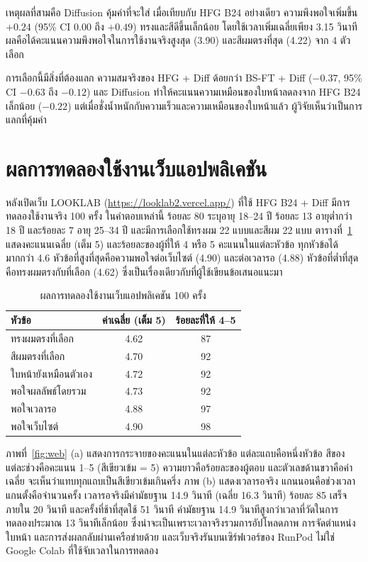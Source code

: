 เหตุผลที่สามคือ Diffusion คุ้มค่าที่จะใส่ เมื่อเทียบกับ HFG B24 อย่างเดียว
ความพึงพอใจเพิ่มขึ้น $+0.24$ (95\% CI 0.00 ถึง $+0.49$) ทรงและสีดีขึ้นเล็กน้อย โดยใช้เวลาเพิ่มเฉลี่ยเพียง 3.15 วินาที
ผลคือได้คะแนนความพึงพอใจในการใช้งานจริงสูงสุด (3.90) และสีผมตรงที่สุด (4.22) จาก 4 ตัวเลือก

การเลือกนี้มีสิ่งที่ต้องแลก ความสมจริงของ HFG + Diff ด้อยกว่า BS-FT + Diff
($-0.37$, 95\% CI $-0.63$ ถึง $-0.12$) และ Diffusion ทำให้คะแนนความเหมือนของใบหน้าลดลงจาก HFG B24 เล็กน้อย ($-0.22$)
แต่เมื่อชั่งน้ำหนักกับความเร็วและความเหมือนของใบหน้าแล้ว ผู้วิจัยเห็นว่าเป็นการแลกที่คุ้มค่า

\section{ผลการทดลองใช้งานเว็บแอปพลิเคชัน}

หลังเปิดเว็บ LOOKLAB (\url{https://looklab2.vercel.app/}) ที่ใช้ HFG B24 + Diff มีการทดลองใช้งานจริง 100 ครั้ง
ในคำตอบเหล่านี้ ร้อยละ 80 ระบุอายุ 18--24 ปี ร้อยละ 13 อายุต่ำกว่า 18 ปี และร้อยละ 7 อายุ 25--34 ปี
และมีการเลือกใช้ทรงผม 22 แบบและสีผม 22 แบบ
ตารางที่~\ref{tab:web} แสดงคะแนนเฉลี่ย (เต็ม 5) และร้อยละของผู้ที่ให้ 4 หรือ 5 คะแนนในแต่ละหัวข้อ
ทุกหัวข้อได้มากกว่า 4.6 หัวข้อที่สูงที่สุดคือความพอใจต่อเว็บไซต์ (4.90) และต่อเวลารอ (4.88)
หัวข้อที่ต่ำที่สุดคือทรงผมตรงกับที่เลือก (4.62) ซึ่งเป็นเรื่องเดียวกับที่ผู้ใช้เขียนข้อเสนอแนะมา

\begin{table}[!htbp]
\centering
\caption{ผลการทดลองใช้งานเว็บแอปพลิเคชัน 100 ครั้ง}
\label{tab:web}
\begin{tabular}{|l|c|c|}
\hline
\textbf{หัวข้อ} & \textbf{ค่าเฉลี่ย (เต็ม 5)} & \textbf{ร้อยละที่ให้ 4--5} \\ \hline
ทรงผมตรงที่เลือก & 4.62 & 87 \\ \hline
สีผมตรงที่เลือก & 4.70 & 92 \\ \hline
ใบหน้ายังเหมือนตัวเอง & 4.72 & 92 \\ \hline
พอใจผลลัพธ์โดยรวม & 4.73 & 92 \\ \hline
พอใจเวลารอ & 4.88 & 97 \\ \hline
พอใจเว็บไซต์ & 4.90 & 98 \\ \hline
\end{tabular}
\end{table}

ภาพที่~\ref{fig:web} (a) แสดงการกระจายของคะแนนในแต่ละหัวข้อ
แต่ละแถบคือหนึ่งหัวข้อ สีของแต่ละช่วงคือคะแนน 1--5 (สีเขียวเข้ม = 5) ความยาวคือร้อยละของผู้ตอบ
และตัวเลขด้านขวาคือค่าเฉลี่ย จะเห็นว่าแทบทุกแถบเป็นสีเขียวเข้มเกินครึ่ง
ภาพ (b) แสดงเวลารอจริง แกนนอนคือช่วงเวลา แกนตั้งคือจำนวนครั้ง
เวลารอจริงมีค่ามัธยฐาน 14.9 วินาที (เฉลี่ย 16.3 วินาที) ร้อยละ 85 เสร็จภายใน 20 วินาที
และครั้งที่ช้าที่สุดใช้ 51 วินาที ค่ามัธยฐาน 14.9 วินาทีสูงกว่าเวลาที่วัดในการทดลองประมาณ 13 วินาทีเล็กน้อย
ซึ่งน่าจะเป็นเพราะเวลาจริงรวมการอัปโหลดภาพ การจัดตำแหน่งใบหน้า และการส่งผลกลับผ่านเครือข่ายด้วย
และเว็บจริงรันบนเซิร์ฟเวอร์ของ RunPod ไม่ใช่ Google Colab ที่ใช้จับเวลาในการทดลอง

